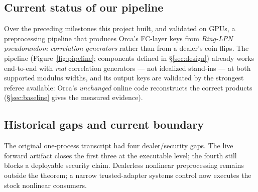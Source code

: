 \documentclass[11pt]{article}
\begin{document}
\subsection{Current status of our pipeline}
\label{sec:status}

Over the preceding milestones this project built, and validated on GPUs, a
preprocessing pipeline that produces Orca's FC-layer keys from \emph{Ring-LPN
pseudorandom correlation generators} rather than from a dealer's coin flips.
The pipeline (Figure~\ref{fig:pipeline}; components defined in
\S\ref{sec:design}) already works end-to-end with \emph{real} correlation
generators --- not idealized stand-ins --- at both supported modulus widths,
and its output keys are validated by the strongest referee available: Orca's
\emph{unchanged} online code reconstructs the correct products
(\S\ref{sec:baseline} gives the measured evidence).

\subsection{Historical gaps and current boundary}
\label{sec:gaps}

The original one-process transcript had four dealer/security gaps. The live
forward artifact closes the first three at the executable level; the fourth
still blocks a deployable security claim. Dealerless nonlinear preprocessing
remains outside the theorem; a narrow trusted-adapter systems control now
executes the stock nonlinear consumers.
\end{document}
